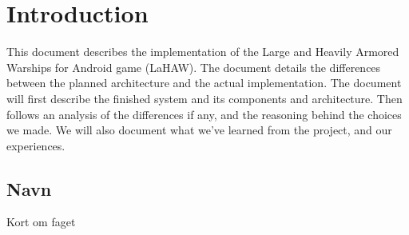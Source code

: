 \chapter{Introduction}

This document describes the implementation of the Large and Heavily Armored Warships for Android game (LaHAW). The document details the differences between the planned architecture and the actual implementation. The document will first describe the finished system and its components and architecture. Then follows an analysis of the differences if any, and the reasoning behind the choices we made. We will also document what we've learned from the project, and our experiences.

\section{Navn}
Kort om faget